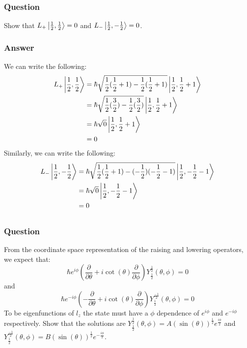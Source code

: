 \documentclass[12pt]{article}
\begin{document}
\subsection{}
\subsubsection{Question}
Show that $L_+ \ket{\frac{1}{2},\frac{1}{2}} = 0$ and $L_- \ket{\frac{1}{2},-\frac{1}{2}} = 0$.
\subsubsection{Answer}
We can write the following:
\begin{align*}
L_+ \ket{\frac{1}{2},\frac{1}{2}} &= \hbar \sqrt{\frac{1}{2}(\frac{1}{2}+1)-\frac{1}{2}(\frac{1}{2}+1)}\ket{\frac{1}{2},\frac{1}{2}+1}\\
&= \hbar \sqrt{\frac{1}{2}(\frac{3}{2}) - \frac{1}{2}(\frac{3}{2})}\ket{\frac{1}{2},\frac{1}{2}+1}\\
&= \hbar \sqrt{0}\ket{\frac{1}{2},\frac{1}{2}+1}\\
&= 0
\end{align*}
Similarly, we can write the following:
\begin{align*}
L_- \ket{\frac{1}{2},-\frac{1}{2}} &= \hbar \sqrt{\frac{1}{2}(\frac{1}{2}+1)-(-\frac{1}{2})(-\frac{1}{2}-1)}\ket{\frac{1}{2},-\frac{1}{2}-1}\\
&= \hbar \sqrt{0}\ket{\frac{1}{2},-\frac{1}{2}-1}\\
&= 0
\end{align*}
\subsection{}
\subsubsection{Question}
From the coordinate space representation of the raising and lowering operators, we expect that:
\begin{equation}
    \hbar e^{i\phi}(\frac{\partial}{\partial \theta} + i\cot(\theta)\frac{\partial}{\partial \phi})Y_{\frac{1}{2}}^{\frac{1}{2}}(\theta,\phi) = 0
\end{equation}
and 
\begin{equation}
    \hbar e^{-i\phi}(-\frac{\partial}{\partial \theta} + i\cot(\theta)\frac{\partial}{\partial \phi})Y_{\frac{1}{2}}^{\frac{-1}{2}}(\theta,\phi) = 0
\end{equation}
To be eigenfunctions of $l_z$ the state must have a $\phi$ dependence of $e^{i\phi}$ and $e^{-i\phi}$ respectively. Show that the solutions are $Y_{\frac{1}{2}}^{\frac{1}{2}}(\theta,\phi) = A (\sin(\theta))^{\frac{1}{2}}e^{\frac{i\phi}{2}}$ and $Y_{\frac{1}{2}}^{\frac{-1}{2}}(\theta,\phi) = B (\sin(\theta))^{\frac{1}{2}}e^{-\frac{i\phi}{2}}$.
\end{document}

